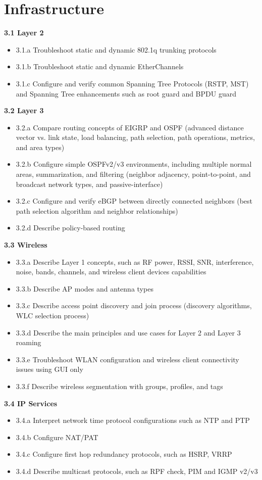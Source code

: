 \documentclass{article}
\begin{document}
\section{Infrastructure}
\textbf{3.1 Layer 2}
\begin{itemize}
\item 3.1.a Troubleshoot static and dynamic 802.1q trunking protocols
\item 3.1.b Troubleshoot static and dynamic EtherChannels
\item 3.1.c Configure and verify common Spanning Tree Protocols (RSTP, MST) and Spanning Tree enhancements such as root guard and BPDU guard
\end{itemize}

\noindent\textbf{3.2 Layer 3}
\begin{itemize}
\item 3.2.a Compare routing concepts of EIGRP and OSPF (advanced distance vector vs. link state, load balancing, path selection, path operations, metrics, and area types)
\item 3.2.b Configure simple OSPFv2/v3 environments, including multiple normal areas, summarization, and filtering (neighbor adjacency, point-to-point, and broadcast network types, and passive-interface)
\item 3.2.c Configure and verify eBGP between directly connected neighbors (best path selection algorithm and neighbor relationships)
\item 3.2.d Describe policy-based routing
\end{itemize}

\noindent\textbf{3.3 Wireless}
\begin{itemize}
\item 3.3.a Describe Layer 1 concepts, such as RF power, RSSI, SNR, interference, noise, bands, channels, and wireless client devices capabilities
\item 3.3.b Describe AP modes and antenna types
\item 3.3.c Describe access point discovery and join process (discovery algorithms, WLC selection process)
\item 3.3.d Describe the main principles and use cases for Layer 2 and Layer 3 roaming
\item 3.3.e Troubleshoot WLAN configuration and wireless client connectivity issues using GUI only
\item 3.3.f Describe wireless segmentation with groups, profiles, and tags
\end{itemize}


\noindent\textbf{3.4 IP Services}
\begin{itemize}
\item 3.4.a Interpret network time protocol configurations such as NTP and PTP
\item 3.4.b Configure NAT/PAT
\item 3.4.c Configure first hop redundancy protocols, such as HSRP, VRRP
\item 3.4.d Describe multicast protocols, such as RPF check, PIM and IGMP v2/v3
\end{itemize}
\end{document}
